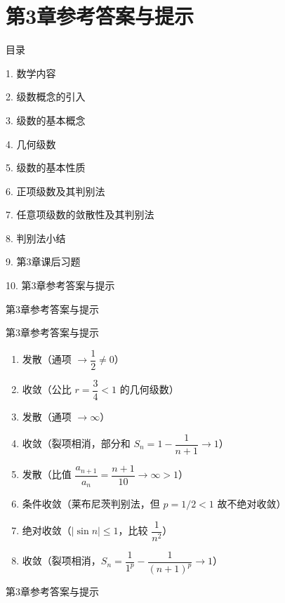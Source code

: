 \documentclass[aspectratio=169,10pt,fontset=fandol]{ctexbeamer}
\begin{document}
\section{第3章参考答案与提示}
\begin{frame}[t,fragile]{目录}
\normalsize
{\color{black}\normalsize 1. 数学内容\par}\vspace{0.3em}
{\color{black}\normalsize 2. 级数概念的引入\par}\vspace{0.3em}
{\color{black}\normalsize 3. 级数的基本概念\par}\vspace{0.3em}
{\color{black}\normalsize 4. 几何级数\par}\vspace{0.3em}
{\color{black}\normalsize 5. 级数的基本性质\par}\vspace{0.3em}
{\color{black}\normalsize 6. 正项级数及其判别法\par}\vspace{0.3em}
{\color{black}\normalsize 7. 任意项级数的敛散性及其判别法\par}\vspace{0.3em}
{\color{black}\normalsize 8. 判别法小结\par}\vspace{0.3em}
{\color{black}\normalsize 9. 第3章课后习题\par}\vspace{0.3em}
{\color{blue}\normalsize 10. 第3章参考答案与提示\par}\vspace{0.3em}
\end{frame}
\begin{frame}[t,fragile]{第3章参考答案与提示}
\small
{\small


}
\end{frame}
\begin{frame}[t,fragile]{第3章参考答案与提示}
\small
{\small
\begin{enumerate}
\item 发散（通项 \(\to \dfrac12 \neq 0\)）
\item 收敛（公比 \(r = \dfrac34 < 1\) 的几何级数）
\item 发散（通项 \(\to \infty\)）
\item 收敛（裂项相消，部分和 \(S_n = 1 - \dfrac{1}{n+1} \to 1\)）
\item 发散（比值 \(\dfrac{a_{n+1}}{a_n} = \dfrac{n+1}{10} \to \infty > 1\)）
\item 条件收敛（莱布尼茨判别法，但 \(p=1/2 < 1\) 故不绝对收敛）
\item 绝对收敛（\(|\sin n| \leq 1\)，比较 \(\dfrac{1}{n^2}\)）
\item 收敛（裂项相消，\(S_n = \dfrac{1}{1^p} - \dfrac{1}{(n+1)^p} \to 1\)）
\end{enumerate}
}
\end{frame}
\begin{frame}[t,fragile]{第3章参考答案与提示}
\small
{\small


\fi


}
\end{frame}
\end{document}
